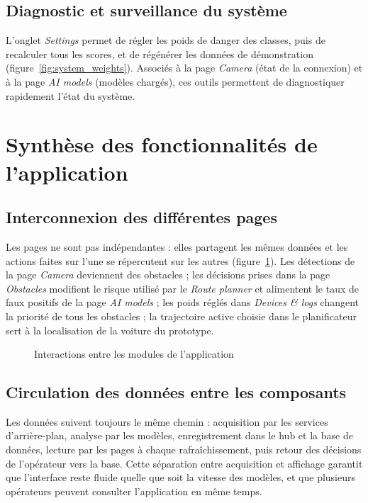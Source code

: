 \subsection{Diagnostic et surveillance du système}
L'onglet \emph{Settings} permet de régler les poids de danger des classes, puis de recalculer tous les scores, et de
régénérer les données de démonstration (figure~\ref{fig:system_weights}). Associés à la page \emph{Camera} (état de la
connexion) et à la page \emph{AI models} (modèles chargés), ces outils permettent de diagnostiquer rapidement l'état du
système.


\section{Synthèse des fonctionnalités de l'application}

\subsection{Interconnexion des différentes pages}
Les pages ne sont pas indépendantes : elles partagent les mêmes données et les actions faites sur l'une se
répercutent sur les autres (figure~\ref{fig:interactions}). Les détections de la page \emph{Camera} deviennent des
obstacles ; les décisions prises dans la page \emph{Obstacles} modifient le risque utilisé par le \emph{Route
planner} et alimentent le taux de faux positifs de la page \emph{AI models} ; les poids réglés dans \emph{Devices \&
logs} changent la priorité de tous les obstacles ; la trajectoire active choisie dans le planificateur sert à la
localisation de la voiture du prototype.

\begin{figure}[H]
\centering
\resizebox{0.95\linewidth}{!}{}
\caption{Interactions entre les modules de l'application}
\label{fig:interactions}
\end{figure}

\subsection{Circulation des données entre les composants}
Les données suivent toujours le même chemin : acquisition par les services d'arrière-plan, analyse par les modèles,
enregistrement dans le hub et la base de données, lecture par les pages à chaque rafraîchissement, puis retour des
décisions de l'opérateur vers la base. Cette séparation entre acquisition et affichage garantit que l'interface reste
fluide quelle que soit la vitesse des modèles, et que plusieurs opérateurs peuvent consulter l'application en même
temps.

